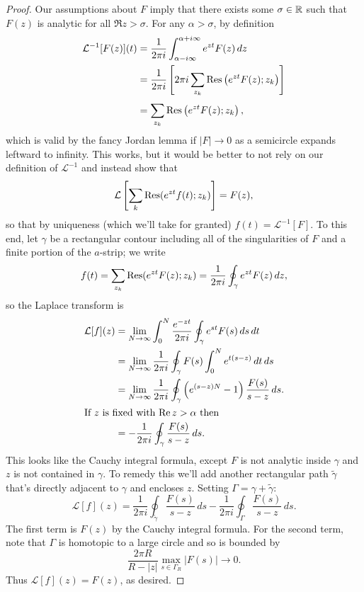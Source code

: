 \documentclass[../m136main.tex]{subfiles}
\begin{document}
\begin{proof}
    Our assumptions about $F$ imply that there exists some $\sigma \in \R$ such that $F(z)$ is analytic for all $\Re z > \sigma$.
    For any $\alpha > \sigma$, by definition
    \begin{align*}
        \mathcal L^{-1}[F(z)](t) &= \frac{1}{2\pi i} \int_{\alpha - i\infty}^{\alpha + i\infty} e^{zt} F(z) \,dz \\
        &= \frac{1}{2\pi i} \left[ 2\pi i \sum_{z_k}^{} \Res \left( e^{zt} F(z); z_k \right) \right] \\
        &= \sum_{z_k}^{} \Res \left( e^{zt} F(z); z_k \right),
    \end{align*}
    which is valid by the fancy Jordan lemma if $|F| \to 0$ as a semicircle expands leftward to infinity.
    This works, but it would be better to not rely on our definition of $\mathcal L^{-1}$ and instead show that
    \[ \mathcal L \left[ \sum_{k}^{} \Res(e^{zt} f(t); z_k) \right] = F(z), \]
    so that by uniqueness (which we'll take for granted) $f(t) = \mathcal L^{-1}[F]$.
    To this end, let $\gamma$ be a rectangular contour including all of the singularities of $F$ and a finite portion of the $a$-strip; we write
    \[ f(t) = \sum_{z_k}^{} \Res(e^{zt} F(z); z_k) = \frac{1}{2\pi i} \oint_\gamma e^{zt} F(z) \,dz, \]
    so the Laplace transform is
    \begin{align*}
        \mathcal L[f](z) &= \lim_{N \to \infty} \int_{0}^{N} \frac{e^{-zt}}{2\pi i} \oint_\gamma e^{st} F(s) \,ds \,dt \\
        &= \lim_{N \to \infty} \frac{1}{2\pi i} \oint_\gamma F(s) \int_{0}^{N} e^{t(s-z)} \,dt\,ds \\
        &= \lim_{N \to \infty} \frac{1}{2\pi i} \oint_\gamma \left( e^{(s-z)N} - 1 \right) \frac{F(s)}{s-z} \,ds. \\
        \intertext{If $z$ is fixed with $\Re z > \alpha$ then}
        &= -\frac{1}{2\pi i} \oint_\gamma \frac{F(s)}{s-z} \,ds.
    \end{align*}
    This looks like the Cauchy integral formula, except $F$ is not analytic inside $\gamma$ and $z$ is not contained in $\gamma$.
    To remedy this we'll add another rectangular path $\tilde \gamma$ that's directly adjacent to $\gamma$ and encloses $z$.
    Setting $\Gamma = \gamma + \tilde \gamma$:
    \[ \mathcal L [f](z) = \frac{1}{2\pi i} \oint_{\tilde \gamma} \frac{F(s)}{s-z} \,ds - \frac{1}{2\pi i} \oint_\Gamma \frac{F(s)}{s-z} \,ds. \]
    The first term is $F(z)$ by the Cauchy integral formula.
    For the second term, note that $\Gamma$ is homotopic to a large circle and so is bounded by
    \[ \frac{2\pi R}{R - |z|} \max_{s \in \Gamma_R} |F(s)| \longrightarrow 0. \]
    Thus $\mathcal L[f](z) = F(z)$, as desired.
\end{proof}
\end{document}
